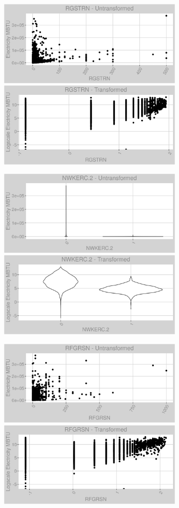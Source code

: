 \newpage
\begin{figure}
\centering
\begin{subfigure}{1\textwidth}
\centering
\includegraphics[width=.49\textwidth, height=0.3\textheight]{Images/electricity_var_original_11.png}
\includegraphics[width=.49\textwidth, height=0.3\textheight]{Images/electricity_var_transformed_11.png}
\end{subfigure}
\begin{subfigure}{1\textwidth}
\centering
\includegraphics[width=.49\textwidth, height=0.3\textheight]{Images/electricity_var_original_12.png}
\includegraphics[width=.49\textwidth, height=0.3\textheight]{Images/electricity_var_transformed_12.png}
\end{subfigure}
\begin{subfigure}{1\textwidth}
\centering
\includegraphics[width=.49\textwidth, height=0.3\textheight]{Images/electricity_var_original_13.png}
\includegraphics[width=.49\textwidth, height=0.3\textheight]{Images/electricity_var_transformed_13.png}
\end{subfigure}
\end{figure}
